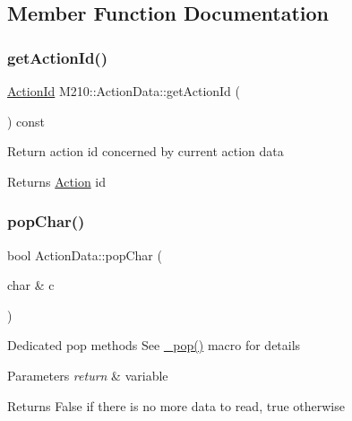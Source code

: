 \subsection{Member Function Documentation}
\mbox{\label{class_m210_1_1_action_data_a9fff91f297d917c9519f3b4d2d2e130b}} 
\subsubsection{\texorpdfstring{get\+Action\+Id()}{getActionId()}}
{\footnotesize\ttfamily \mbox{\hyperlink{class_m210_1_1_action_data_a35cd47f396d015ad523e845ddfaeab4c}{Action\+Id}} M210\+::\+Action\+Data\+::get\+Action\+Id (\begin{DoxyParamCaption}{ }\end{DoxyParamCaption}) const\hspace{0.3cm}{\ttfamily [inline]}}

Return action id concerned by current action data \begin{DoxyReturn}{Returns}
\mbox{\hyperlink{class_m210_1_1_action}{Action}} id 
\end{DoxyReturn}
\mbox{\label{class_m210_1_1_action_data_a590c1f07f361ace0bdf6072abec3cf48}} 
\subsubsection{\texorpdfstring{pop\+Char()}{popChar()}}
{\footnotesize\ttfamily bool Action\+Data\+::pop\+Char (\begin{DoxyParamCaption}\item[{char \&}]{c }\end{DoxyParamCaption})}

Dedicated pop methods See \mbox{\hyperlink{_action_data_8h_a4f0419f16d53bad043d5f85da427969d}{\+\_\+pop()}} macro for details 
\begin{DoxyParams}{Parameters}
{\em return} & variable \\
\hline
\end{DoxyParams}
\begin{DoxyReturn}{Returns}
False if there is no more data to read, true otherwise 
\end{DoxyReturn}
\mbox{\label{class_m210_1_1_action_data_afc4ee6af4070e59d6753b85e150c0b88}} 
